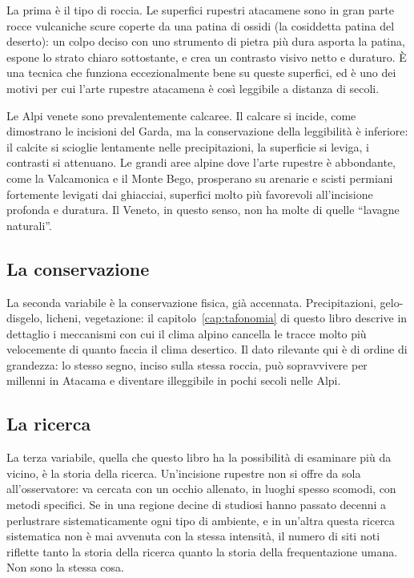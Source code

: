 La prima è il tipo di roccia. Le superfici rupestri atacamene sono in gran parte rocce vulcaniche scure coperte da una patina di ossidi (la cosiddetta patina del deserto): un colpo deciso con uno strumento di pietra più dura asporta la patina, espone lo strato chiaro sottostante, e crea un contrasto visivo netto e duraturo. È una tecnica che funziona eccezionalmente bene su queste superfici, ed è uno dei motivi per cui l'arte rupestre atacamena è così leggibile a distanza di secoli.

Le Alpi venete sono prevalentemente calcaree. Il calcare si incide, come dimostrano le incisioni del Garda, ma la conservazione della leggibilità è inferiore: il calcite si scioglie lentamente nelle precipitazioni, la superficie si leviga, i contrasti si attenuano. Le grandi aree alpine dove l'arte rupestre è abbondante, come la Valcamonica e il Monte Bego, prosperano su arenarie e scisti permiani fortemente levigati dai ghiacciai, superfici molto più favorevoli all'incisione profonda e duratura. Il Veneto, in questo senso, non ha molte di quelle ``lavagne naturali''.

\subsection{La conservazione}

La seconda variabile è la conservazione fisica, già accennata. Precipitazioni, gelo-disgelo, licheni, vegetazione: il capitolo~\ref{cap:tafonomia} di questo libro descrive in dettaglio i meccanismi con cui il clima alpino cancella le tracce molto più velocemente di quanto faccia il clima desertico. Il dato rilevante qui è di ordine di grandezza: lo stesso segno, inciso sulla stessa roccia, può sopravvivere per millenni in Atacama e diventare illeggibile in pochi secoli nelle Alpi.

\subsection{La ricerca}

La terza variabile, quella che questo libro ha la possibilità di esaminare più da vicino, è la storia della ricerca. Un'incisione rupestre non si offre da sola all'osservatore: va cercata con un occhio allenato, in luoghi spesso scomodi, con metodi specifici. Se in una regione decine di studiosi hanno passato decenni a perlustrare sistematicamente ogni tipo di ambiente, e in un'altra questa ricerca sistematica non è mai avvenuta con la stessa intensità, il numero di siti noti riflette tanto la storia della ricerca quanto la storia della frequentazione umana. Non sono la stessa cosa.

